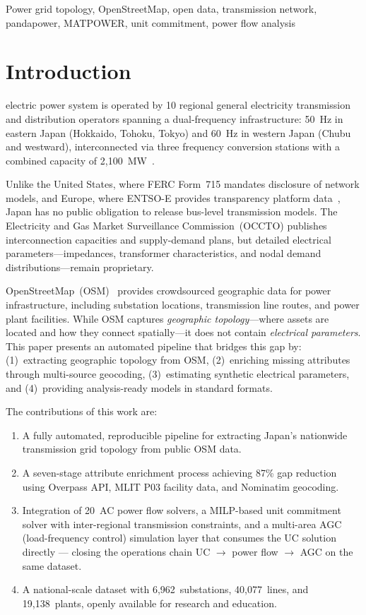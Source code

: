 \documentclass[journal]{IEEEtran}
\begin{document}
\begin{IEEEkeywords}
Power grid topology, OpenStreetMap, open data, transmission network, pandapower, MATPOWER, unit commitment, power flow analysis
\end{IEEEkeywords}

\IEEEpeerreviewmaketitle

\section{Introduction}
 electric power system is operated by 10 regional general electricity transmission and distribution operators spanning a dual-frequency infrastructure: 50~Hz in eastern Japan (Hokkaido, Tohoku, Tokyo) and 60~Hz in western Japan (Chubu and westward), interconnected via three frequency conversion stations with a combined capacity of 2,100~MW~\cite{occto2023}.

Unlike the United States, where FERC Form~715 mandates disclosure of network models, and Europe, where ENTSO-E provides transparency platform data~\cite{entsoe}, Japan has no public obligation to release bus-level transmission models. The Electricity and Gas Market Surveillance Commission~(OCCTO) publishes interconnection capacities and supply-demand plans, but detailed electrical parameters---impedances, transformer characteristics, and nodal demand distributions---remain proprietary.

OpenStreetMap~(OSM)~\cite{osm} provides crowdsourced geographic data for power infrastructure, including substation locations, transmission line routes, and power plant facilities. While OSM captures \textit{geographic topology}---where assets are located and how they connect spatially---it does not contain \textit{electrical parameters}. This paper presents an automated pipeline that bridges this gap by: (1)~extracting geographic topology from OSM, (2)~enriching missing attributes through multi-source geocoding, (3)~estimating synthetic electrical parameters, and (4)~providing analysis-ready models in standard formats.

The contributions of this work are:
\begin{enumerate}
  \item A fully automated, reproducible pipeline for extracting Japan's nationwide transmission grid topology from public OSM data.
  \item A seven-stage attribute enrichment process achieving 87\% gap reduction using Overpass API, MLIT P03 facility data, and Nominatim geocoding.
  \item Integration of 20~AC power flow solvers, a MILP-based unit commitment solver with inter-regional transmission constraints, and a multi-area AGC (load-frequency control) simulation layer that consumes the UC solution directly --- closing the operations chain UC $\to$ power flow $\to$ AGC on the same dataset.
  \item A national-scale dataset with 6,962~substations, 40,077~lines, and 19,138~plants, openly available for research and education.
\end{enumerate}
\end{document}
